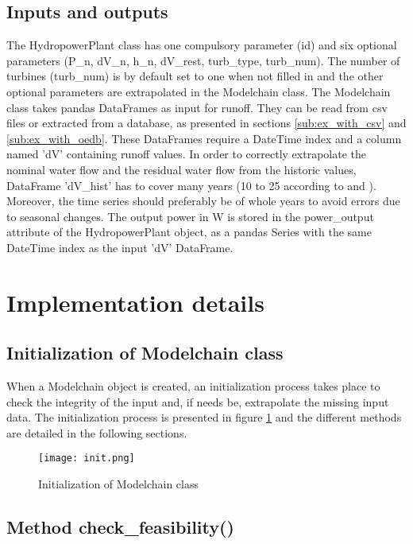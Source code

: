 \subsection{Inputs and outputs}

The HydropowerPlant class has one compulsory parameter (id) and six optional parameters (P{\_}n, dV{\_}n, h{\_}n, dV{\_}rest, turb{\_}type, turb{\_}num). The number of turbines (turb{\_}num) is by default set to one when not filled in and the other optional parameters are extrapolated in the Modelchain class. \newline 
The Modelchain class takes pandas DataFrames as input for runoff. They can be read from csv files or extracted from a database, as presented in sections \ref{sub:ex_with_csv} and \ref{sub:ex_with_oedb}. These DataFrames require a DateTime index and a column named 'dV' containing runoff values. In order to correctly extrapolate the nominal water flow and the residual water flow from the historic values, DataFrame 'dV{\_}hist' has to cover many years (10 to 25 according to \cite{pacer} and \cite{cetmef}). Moreover, the time series should preferably be of whole years to avoid errors due to seasonal changes. \newline
The output power in \unit{W} is stored in the power{\_}output attribute of the HydropowerPlant object, as a pandas Series with the same DateTime index as the input 'dV' DataFrame.

\section{Implementation details}

\subsection{Initialization of Modelchain class}

When a Modelchain object is created, an initialization process takes place to check the integrity of the input and, if needs be, extrapolate the missing input data. The initialization process is presented in figure \ref{init} and the different methods are detailed in the following sections.

\begin{figure}[H]
\centering
\texttt{[image: init.png]}
\caption{Initialization of Modelchain class}
\label{init}
\end{figure}

\subsection{Method check{\_}feasibility()}
\label{sub:check_feas}

